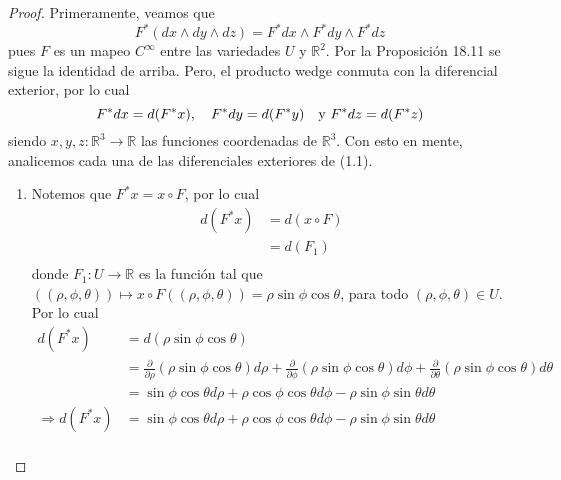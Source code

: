 \documentclass[12pt]{report}
\theoremstyle{largebreak}
\newcommand\cf[3]{\ensuremath{#1:#2\rightarrow#3}}
\begin{document}
    \begin{proof}
        Primeramente, veamos que
        \begin{equation*}
            F^*(dx\wedge dy\wedge dz)=F^*dx\wedge F^*dy\wedge F^*dz
        \end{equation*}
        pues $F$ es un mapeo $C^\infty$ entre las variedades $U$ y $\mathbb{R}^2$. Por la Proposición 18.11 se sigue la identidad de arriba.
        Pero, el producto wedge conmuta con la diferencial exterior, por lo cual
        \begin{equation}
            F^*dx=d(F^*x),\quad F^*dy=d(F^*y)\quad\textup{y }F^*dz=d(F^*z)
        \end{equation}
        siendo $\cf{x,y,z}{\mathbb{R}^3}{\mathbb{R}}$ las funciones coordenadas de $\mathbb{R}^3$. Con esto en mente, analicemos cada una de las diferenciales exteriores de (1.1).
        \begin{enumerate}
            \item Notemos que $F^*x=x\circ F$, por lo cual
            \begin{equation*}
                \begin{split}
                    d(F^*x)&=d(x\circ F)\\
                    &=d(F_1)\\
                \end{split}
            \end{equation*}
            donde $\cf{F_1}{U}{\mathbb{R}}$ es la función tal que $((\rho,\phi,\theta))\mapsto x\circ F((\rho,\phi,\theta))=\rho\sin\phi \cos\theta$, para todo $(\rho,\phi,\theta)\in U$. Por lo cual
            \begin{equation*}
                \begin{split}
                    d(F^*x)&=d(\rho\sin\phi\cos\theta)\\
                    &=\frac{\partial}{\partial\rho}(\rho\sin\phi\cos\theta)d\rho+\frac{\partial}{\partial\phi}(\rho\sin\phi\cos\theta)d\phi+\frac{\partial}{\partial\theta}(\rho\sin\phi\cos\theta)d\theta\\
                    &=\sin\phi\cos\theta d\rho+\rho\cos\phi\cos\theta d\phi-\rho\sin\phi\sin\theta d\theta\\
                    \Rightarrow d(F^*x)&=\sin\phi\cos\theta d\rho+\rho\cos\phi\cos\theta d\phi-\rho\sin\phi\sin\theta d\theta\\
                \end{split}
            \end{equation*}

\end{enumerate}
\end{proof}
\end{document}
